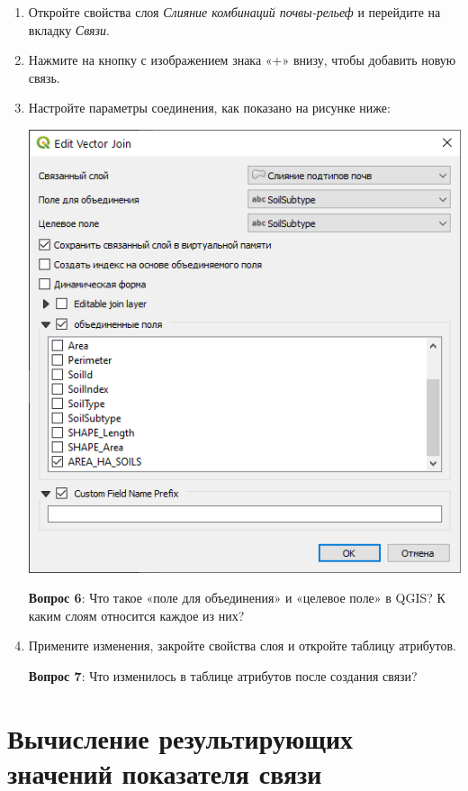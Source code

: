 \documentclass[
  12pt,
]{book}
\begin{document}
\begin{enumerate}
\def\labelenumi{\arabic{enumi}.}
\item
  Откройте свойства слоя \emph{Слияние комбинаций почвы-рельеф} и перейдите на вкладку \emph{Связи}.
\item
  Нажмите на кнопку с изображением знака «+» внизу, чтобы добавить новую связь.
\item
  Настройте параметры соединения, как показано на рисунке ниже:

  \includegraphics{images/Ex06/tablejoin1.png}

  \textbf{Вопрос 6}: Что такое «поле для объединения» и «целевое поле» в QGIS? К каким слоям относится каждое из них?
\item
  Примените изменения, закройте свойства слоя и откройте таблицу атрибутов.

  \textbf{Вопрос 7}: Что изменилось в таблице атрибутов после создания связи?
\end{enumerate}

\hypertarget{overlay-resulting}{%
\section{Вычисление результирующих значений показателя связи}\label{overlay-resulting}}
\end{document}
